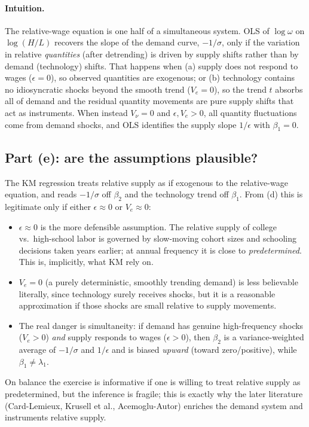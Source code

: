 \documentclass[11pt]{article}
\begin{document}
\paragraph{Intuition.} The relative-wage equation is one half of a
simultaneous system. OLS of $\log\omega$ on $\log(H/L)$ recovers the
slope of the demand curve, $-1/\sigma$, only if the variation in relative
\emph{quantities} (after detrending) is driven by supply shifts rather than by
demand (technology) shifts. That happens when (a) supply does not respond to
wages ($\epsilon=0$), so observed quantities are exogenous; or (b) technology
contains no idiosyncratic shocks beyond the smooth trend ($V_e=0$), so the
trend $t$ absorbs all of demand and the residual quantity movements are pure
supply shifts that act as instruments. When instead $V_\nu=0$ and
$\epsilon,V_e>0$, all quantity fluctuations come from demand shocks, and OLS
identifies the supply slope $1/\epsilon$ with $\beta_1=0$.

\subsection*{Part (e): are the assumptions plausible?}

The KM regression treats relative supply as if exogenous to the relative-wage
equation, and reads $-1/\sigma$ off $\beta_2$ and the technology trend off
$\beta_1$. From (d) this is legitimate only if either $\epsilon\approx0$ or
$V_e\approx0$:
\begin{itemize}[nosep]
\item $\epsilon\approx0$ is the more defensible assumption. The relative supply
of college vs.\ high-school labor is governed by slow-moving cohort sizes and
schooling decisions taken years earlier; at annual frequency it is close to
\emph{predetermined}. This is, implicitly, what KM rely on.
\item $V_e=0$ (a purely deterministic, smoothly trending demand) is less
believable literally, since technology surely receives shocks, but it is a
reasonable approximation if those shocks are small relative to supply movements.
\item The real danger is simultaneity: if demand has genuine high-frequency
shocks ($V_e>0$) \emph{and} supply responds to wages ($\epsilon>0$), then
$\beta_2$ is a variance-weighted average of $-1/\sigma$ and $1/\epsilon$ and is
biased \emph{upward} (toward zero/positive), while $\beta_1\neq\lambda_1$.
\end{itemize}
On balance the exercise is informative if one is willing to treat relative
supply as predetermined, but the inference is fragile; this is exactly why the
later literature (Card-Lemieux, Krusell et al., Acemoglu-Autor) enriches the
demand system and instruments relative supply.
\end{document}
